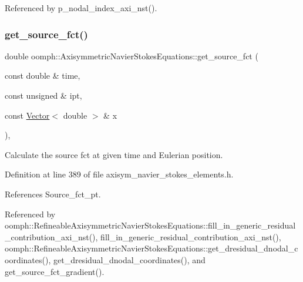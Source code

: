 Referenced by p\+\_\+nodal\+\_\+index\+\_\+axi\+\_\+nst().

\mbox{\label{classoomph_1_1AxisymmetricNavierStokesEquations_a7b965ac308b3a398a9365d76aa21a65f}} 
\subsubsection{\texorpdfstring{get\+\_\+source\+\_\+fct()}{get\_source\_fct()}}
{\footnotesize\ttfamily double oomph\+::\+Axisymmetric\+Navier\+Stokes\+Equations\+::get\+\_\+source\+\_\+fct (\begin{DoxyParamCaption}\item[{const double \&}]{time,  }\item[{const unsigned \&}]{ipt,  }\item[{const \hyperlink{classoomph_1_1Vector}{Vector}$<$ double $>$ \&}]{x }\end{DoxyParamCaption})\hspace{0.3cm}{\ttfamily [inline]}, {\ttfamily [protected]}}



Calculate the source fct at given time and Eulerian position. 



Definition at line 389 of file axisym\+\_\+navier\+\_\+stokes\+\_\+elements.\+h.



References Source\+\_\+fct\+\_\+pt.



Referenced by oomph\+::\+Refineable\+Axisymmetric\+Navier\+Stokes\+Equations\+::fill\+\_\+in\+\_\+generic\+\_\+residual\+\_\+contribution\+\_\+axi\+\_\+nst(), fill\+\_\+in\+\_\+generic\+\_\+residual\+\_\+contribution\+\_\+axi\+\_\+nst(), oomph\+::\+Refineable\+Axisymmetric\+Navier\+Stokes\+Equations\+::get\+\_\+dresidual\+\_\+dnodal\+\_\+coordinates(), get\+\_\+dresidual\+\_\+dnodal\+\_\+coordinates(), and get\+\_\+source\+\_\+fct\+\_\+gradient().

\mbox{\label{classoomph_1_1AxisymmetricNavierStokesEquations_a9b7e10587877daae2ef6be75cc35bef8}} 
